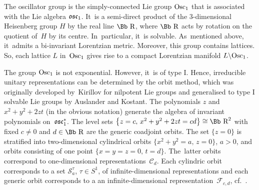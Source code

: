 \documentclass[10pt,a4paper]{amsart}
\newcommand\RR{{\mbox{\Bb R}}}
\newcommand\cC{{\mathcal C}}
\newcommand\cF{{\mathcal F}}
\newcommand\osc{\frak o \frak s \frak c}
\newcommand{\Osc}{{\rm Osc}}
\numberwithin{equation}{section}
\begin{document}
The oscillator group is the simply-connected Lie group $\Osc_1$ that is associated with the Lie algebra $\osc_1$. It~is a semi-direct product of the 3-dimensional Heisenberg group $H$ by the real line $\RR$, where $\RR$ acts by rotation on the quotient of~$H$ by its centre. In~particular, it~is solvable. As~mentioned above, it~admits a bi-invariant Lorentzian metric. Moreover, this group contains lattices. So, each lattice $L$ in~$\Osc_1$ gives rise to a compact Lorentzian manifold $L\backslash \Osc_1$.

The group $\Osc_1$ is not exponential. However, it~is of type I. Hence, irreducible unitary representations can be determined by the orbit method, which was originally developed by~Kirillov for nilpotent Lie groups and generalised to type I solvable Lie groups by Auslander and Kostant. The polynomials $z$ and $x^2+y^2+2zt$ (in the obvious notation) generate the algebra of invariant polynomials on~$\osc_1^*$. The level sets $\big\{z=c,\, x^2+y^2+2zt=cd\big\}\cong\RR^2$ with fixed $c\not=0$ and $d\in\RR$ are the generic coadjoint orbits. The set $\{ z=0\}$ is stratified into two-dimensional cylindrical orbits $\big\{x^2+y^2=a,\, z=0\big\}$, $a>0$, and orbits consisting of one point $\{x=y=z=0,\, t=d\}$. The~latter orbits correspond to one-dimensional representations~$\cC_d$. Each cylindric \mbox{orbit} corresponds to a set ${\mathcal S}_a^\tau$, $\tau\in S^1$, of infinite-dimensional representations and each generic orbit corresponds to a an infinite-dimensional representation~$\cF_{c,d}$, cf.~\cite{Ki04}.
\end{document}
